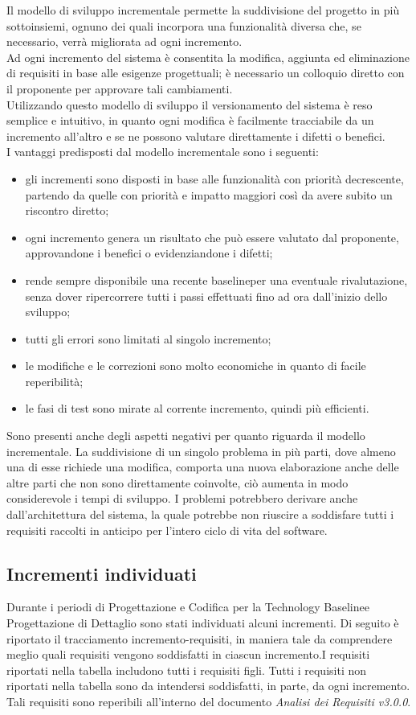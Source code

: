 Il modello di sviluppo incrementale permette la suddivisione del progetto in più sottoinsiemi,
ognuno dei quali incorpora una funzionalità diversa che, se necessario, verrà migliorata ad ogni incremento.  \\
Ad ogni incremento del sistema è consentita la modifica, aggiunta ed eliminazione di requisiti in base alle esigenze progettuali; 
è necessario un colloquio diretto con il proponente per approvare tali cambiamenti. \\
Utilizzando questo modello di sviluppo il versionamento del sistema è reso semplice e intuitivo, in quanto ogni modifica è facilmente tracciabile da un incremento all'altro e se ne possono valutare direttamente i difetti o benefici.\\
I vantaggi predisposti dal modello incrementale sono i seguenti:
\begin{itemize}
	\item gli incrementi sono disposti in base alle funzionalità con priorità decrescente, partendo da quelle con priorità e impatto maggiori
	così da avere subito un riscontro diretto;
	\item ogni incremento genera un risultato che può essere valutato dal proponente, approvandone i benefici o evidenziandone i difetti;
	\item rende sempre disponibile una recente baseline\glosp per una eventuale rivalutazione, senza dover ripercorrere tutti i passi effettuati fino ad ora dall'inizio dello sviluppo;
	\item tutti gli errori sono limitati al singolo incremento;
	\item le modifiche e le correzioni sono molto economiche in quanto di facile reperibilità;
	\item le fasi di test sono mirate al corrente incremento, quindi più efficienti.
\end{itemize}
Sono presenti anche degli aspetti negativi per quanto riguarda il modello incrementale. La suddivisione di un singolo problema in più parti, dove almeno una di esse richiede una modifica, comporta una nuova elaborazione anche delle altre parti che non sono direttamente coinvolte, ciò aumenta in modo considerevole i tempi di sviluppo.
I problemi potrebbero derivare anche dall'architettura del sistema, la quale potrebbe non riuscire a soddisfare tutti i requisiti raccolti in anticipo per l'intero ciclo di vita del software.

\subsection{Incrementi individuati}
Durante i periodi di Progettazione e Codifica per la Technology Baseline\glosp e Progettazione di Dettaglio sono stati individuati alcuni incrementi. Di seguito è riportato il tracciamento incremento-requisiti, in maniera tale da comprendere meglio quali requisiti vengono soddisfatti in ciascun incremento.I requisiti riportati nella tabella includono tutti i requisiti figli. Tutti i requisiti non riportati nella tabella sono da intendersi soddisfatti, in parte, da ogni incremento. Tali requisiti sono reperibili all'interno del documento \textit{Analisi dei Requisiti v3.0.0}.


